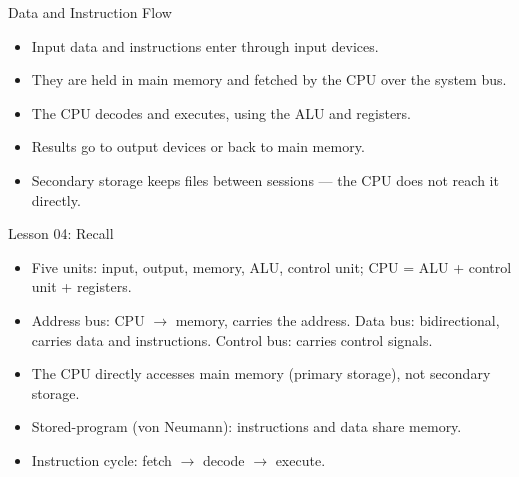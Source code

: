 \documentclass[aspectratio=169]{beamer}
\begin{document}
\begin{frame}{Data and Instruction Flow}
  \begin{itemize}
    \item Input data and instructions enter through input devices.
    \item They are held in main memory and fetched by the CPU over the
      system bus.
    \item The CPU decodes and executes, using the ALU and registers.
    \item Results go to output devices or back to main memory.
    \item Secondary storage keeps files between sessions --- the CPU does
      not reach it directly.
  \end{itemize}
\end{frame}

\begin{frame}{Lesson 04: Recall}
  \begin{itemize}
    \item Five units: input, output, memory, ALU, control unit;
      CPU = ALU + control unit + registers.
    \item Address bus: CPU $\rightarrow$ memory, carries the address. Data
      bus: bidirectional, carries data and instructions. Control bus: carries
      control signals.
    \item The CPU directly accesses main memory (primary storage), not
      secondary storage.
    \item Stored-program (von Neumann): instructions and data share memory.
    \item Instruction cycle: fetch $\rightarrow$ decode $\rightarrow$ execute.
  \end{itemize}
\end{frame}
\end{document}
